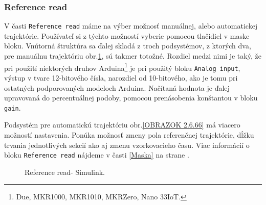 \subsubsection{Reference read}
\label{AngleRead}

V časti \verb|Reference read| máme na výber možnosť manuálnej, alebo automatickej trajektórie. Používateľ si z týchto možností vyberie pomocou tlačidiel v maske bloku. Vnútorná štruktúra sa ďalej skladá z troch podsystémov, z ktorých dva, pre manuálnu trajektóriu obr.\ref{OBRAZOK 2.6.5}, sú takmer totožné. Rozdiel medzi nimi je taký, že pri použití niektorých druhov Arduina\footnote[11]{Due, MKR1000, MKR1010, MKRZero, Nano 33IoT.} je pri použitý bloku \verb|Analog input|, výstup v tvare 12-bitového čísla, narozdiel od 10-bitového, ako je tomu pri ostatných podporovaných modeloch Arduina. Načítaná hodnota je ďalej upravovaná do percentuálnej podoby, pomocou prenásobenia konštantou v bloku \verb*|gain|. 

Podsystém pre automatickú trajektóriu obr.\ref{OBRAZOK 2.6.66} má viacero možností nastavenia. Ponúka možnosť zmeny pola referenčnej trajektórie, dĺžku trvania jednotlivých sekcií ako aj zmenu vzorkovacieho času. Viac informácií o bloku \verb|Reference read| nájdeme v časti \ref{Maska} na strane \pageref{Maska}. 

\begin{figure}[!tbh]
	\hfill
	\hfill
	\hfill
	\caption{Reference read- Simulink.}\label{OBRAZOK 2.6.5}
\end{figure}

